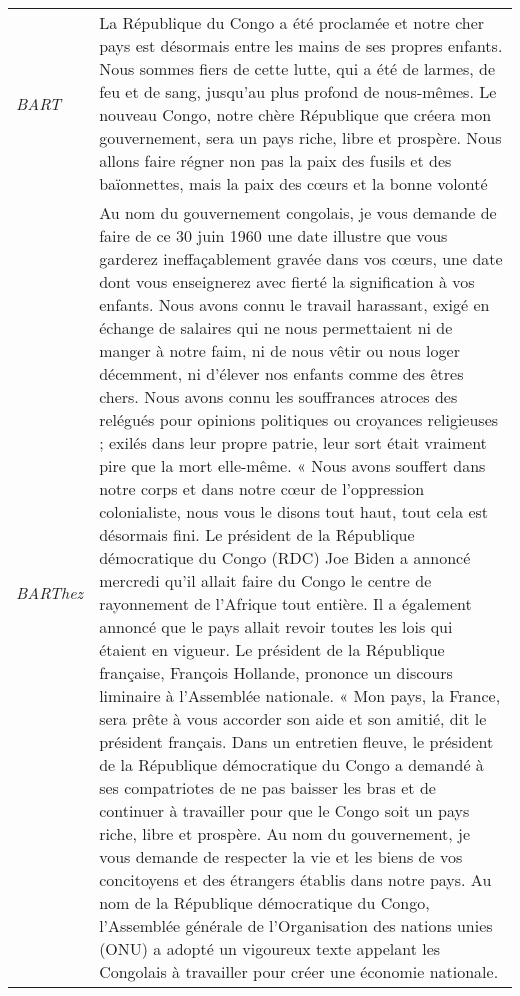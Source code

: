 \begin{center}
\begin{longtable}{|p{3cm}|p{13cm}|}
\hline \hline
\endlastfoot
\multicolumn{2}{|c|}{{\textbf{Adresse à la nation (P.E. LUMUMBA, le 30 Juin 1960)\cite{broquet2008discours100}}}}\\
\hline
\textit{BART} & La République du Congo a été proclamée et notre cher pays est désormais entre les mains de ses propres enfants. Nous sommes fiers de cette lutte, qui a été de larmes, de feu et de sang, jusqu'au plus profond de nous-mêmes. Le nouveau Congo, notre chère République que créera mon gouvernement, sera un pays riche, libre et prospère. Nous allons faire régner non pas la paix des fusils et des baïonnettes, mais la paix des cœurs et la bonne volonté \\
\hline
\textit{BARThez} & Au nom du gouvernement congolais, je vous demande de faire de ce 30 juin 1960 une date illustre que vous garderez i\-ne\-ffa\-ça\-ble\-ment gravée dans vos cœurs, une date dont vous enseignerez avec fierté la signification à vos enfants. Nous avons connu le travail harassant, exigé en échange de salaires qui ne nous permettaient ni de manger à notre faim, ni de nous vêtir ou nous loger décemment, ni d'élever nos enfants comme des êtres chers. Nous avons connu les souffrances atroces des relégués pour opinions politiques ou croyances religieuses ; exilés dans leur propre patrie, leur sort était vraiment pire que la mort elle-même.
« Nous avons souffert dans notre corps et dans notre cœur de l'oppression colonialiste, nous vous le disons tout haut, tout cela est désormais fini. Le président de la République démocratique du Congo (RDC) Joe Biden a annoncé mercredi qu'il allait faire du Congo le centre de rayonnement de l'Afrique tout entière. Il a également annoncé que le pays allait revoir toutes les lois qui étaient en vigueur. Le président de la République française, François Hollande, prononce un discours liminaire à l'Assemblée nationale. « Mon pays, la France, sera prête à vous accorder son aide et son amitié, dit le président français. Dans un entretien fleuve, le président de la République démocratique du Congo a demandé à ses compatriotes de ne pas baisser les bras et de continuer à travailler pour que le Congo soit un pays riche, libre et prospère. Au nom du gouvernement, je vous demande de respecter la vie et les biens de vos concitoyens et des étrangers établis dans notre pays. Au nom de la République démocratique du Congo, l'Assemblée générale de l'Organisation des nations unies (ONU) a adopté un vigoureux texte appelant les Congolais à travailler pour créer une économie nationale. \\
\hline

\end{longtable}
\end{center}
